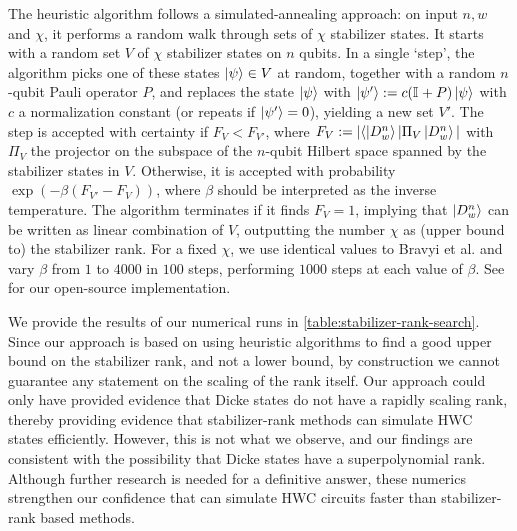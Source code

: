 The heuristic algorithm follows a simulated-annealing approach: on input $n,w $ and $\chi$, it performs a random walk through sets of $\chi$ stabilizer states.
It starts with a random set $V$ of $\chi$ stabilizer states on $n$ qubits.
In a single `step', the algorithm picks one of these states $\ket{\psi} \in V$ at random, together with a random $n$-qubit Pauli operator $P$, and replaces the state $\ket{\psi}$ with $\ket{\psi'} := c(\mathbb{I}_{} + P)\ket{\psi}$ with $c$ a normalization constant (or repeats if $\ket{\psi'} = 0$), yielding a new set $V'$.
The step is accepted with certainty if $F_V < F_{V'}$, where $F_V:= |\langle \ket{D^{n}_{w}}| \Pi_V \ket{D^{n}_{w}}|$ with $\Pi_V$ the projector on the subspace of the $n$-qubit Hilbert space spanned by the stabilizer states in $V$.
Otherwise, it is accepted with probability $\exp(-\beta (F_{V'} - F_V))$, where $\beta$ should be interpreted as the inverse temperature.
The algorithm terminates if it finds $F_V = 1$, implying that $\ket{D^{n}_{w}}$ can be written as linear combination of $V$, outputting the number $\chi$ as (upper bound to) the stabilizer rank.
For a fixed $\chi$, we use identical values to Bravyi et al. \cite{bravyi2016trading} and vary $\beta$ from $1$ to $4000$ in $100$ steps, performing $1000$ steps at each value of $\beta$.
See \cite{githubrepo} for our open-source implementation.

We provide the results of our numerical runs in \autoref{table:stabilizer-rank-search}.
Since our approach is based on using heuristic algorithms to find a good upper bound on the stabilizer rank, and not a lower bound, by construction we cannot guarantee any statement on the scaling of the rank itself.
Our approach could only have provided evidence that Dicke states do not have a rapidly scaling rank, thereby providing evidence that stabilizer-rank methods can simulate HWC states efficiently.
However, this is not what we observe, and our findings are consistent with the possibility that Dicke states have a superpolynomial rank.
Although further research is needed for a definitive answer, these numerics strengthen our confidence that \limdds can simulate HWC circuits faster than stabilizer-rank based methods.

%
